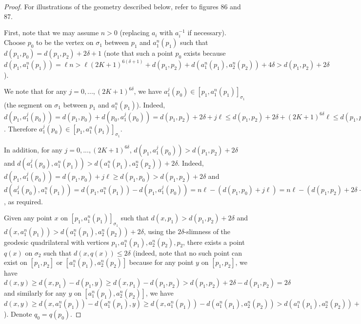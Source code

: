 \documentclass[12pt]{article}
\newcommand{\vs}{\vskip10pt}
\begin{document}
	\begin{proof}
		
		For illustrations of the geometry described below, refer to figures 86 and 87. 
		
		\vs
		
		First, note that we may assume $n > 0$ (replacing $a_i$ with $a_i^{-1}$ if necessary). Choose $p_0$ to be the vertex on $\sigma_1$ between $p_1$ and $a_1^n (p_1)$ such that $d(p_1, p_0) = d(p_1, p_2) + 2 \delta + 1$ (note that such a point $p_0$ exists because $d(p_1, a_1^n (p_1)) = \ell n > \ell (2K + 1)^{6 (\delta + 1)} + d(p_1, p_2) + d(a_1^n(p_1), a_2^n(p_2)) + 4 \delta > d(p_1, p_2) + 2 \delta$). 
		
		\vs 
		
		We note that for any $j = 0,..., (2K+1)^{6 \delta}$, we have $a_1^j (p_0) \in [p_1, a_1^n(p_1)]_{\sigma_1}$ (the segment on $\sigma_1$ between $p_1$ and $a_1^n(p_1)$). Indeed, $d(p_1, a_1^j (p_0)) = d(p_1, p_0) + d(p_0, a_1^j(p_0)) = d(p_1, p_2) + 2\delta + j \ell \leq d(p_1, p_2) + 2\delta + (2K + 1)^{6 \delta}\ell \leq d(p_1, p_2) + d(a_1^n(p_1), a_2^n(p_2)) + 4\delta + (2K + 1)^{6 \delta}\ell < \ell n = d(p_1, a_1^n (p_1))$. Therefore $a_1^j(p_0) \in [p_1, a_1^n(p_1)]_{\sigma_1}$. 
		
		\vs 
		
		In addition, for any $j = 0,..., (2K+1)^{6 \delta}$, $d(p_1, a_1^j(p_0)) > d(p_1, p_2) + 2 \delta$ and $d(a_1^j (p_0), a_1^n(p_1)) > d(a_1^n(p_1), a_2^n(p_2)) + 2 \delta$. Indeed, $d(p_1, a_1^j (p_0)) = d(p_1, p_0) + j \ell \geq d(p_1, p_0) > d(p_1, p_2) + 2 \delta$ and $d(a_1^j (p_0), a_1^n (p_1)) = d(p_1, a_1^n(p_1)) - d(p_1, a_1^j (p_0)) = n \ell - (d(p_1, p_0) + j \ell) = n \ell - (d(p_1, p_2) + 2 \delta + 1 + j \ell) \geq n\ell - (2K+1)^{6 \delta} \ell - d(p_1, p_2) - 2 \delta - 1 > (2K + 1)^{6 (\delta+1)} + d(p_1, p_2) + d(a_1^n(p_1), a_2^n (p_2)) + 4 \delta - (2K+1)^{6 \delta} \ell - d(p_1, p_2) - 2 \delta  - 1 > d(a_1^n (p_1), a_2^n (p_2)) + 2 \delta$, as required.
		
		\vs 
		
		Given any point $x$ on $[p_1, a_1^n (p_1)]_{\sigma_1}$ such that $d(x, p_1) > d(p_1, p_2) + 2 \delta$ and $d(x, a_1^n (p_1)) > d(a_1^n (p_1), a_2^n (p_2)) + 2 \delta$, using the $2\delta$-slimness of the geodesic quadrilateral with vertices $p_1, a_1^n (p_1), a_2^n (p_2), p_2$, there exists a point $q(x)$ on $\sigma_2$ such that $d(x, q(x)) \leq 2 \delta$ (indeed, note that no such point can exist on $[p_1, p_2]$ or $[a_1^n (p_1), a_2^n (p_2)]$ because for any point $y$ on $[p_1, p_2]$, we have $d(x,y) \geq d(x, p_1) - d(p_1, y) \geq d(x, p_1) - d(p_1, p_2) > d(p_1, p_2) + 2\delta - d(p_1, p_2) = 2\delta$ and similarly for any $y$ on $[a_1^n (p_1), a_2^n (p_2)]$, we have $d(x, y) \geq d(x, a_1^n (p_1)) - d(a_1^n (p_1), y) \geq d(x, a_1^n (p_1)) - d(a_1^n (p_1), a_2^n (p_2)) > d(a_1^n (p_1), a_2 ^n (p_2)) + 2\delta - d(a_1 ^n (p_1), a_2^n (p_2)) = 2 \delta$). Denote $q_0 = q(p_0)$. 
		

\end{proof}
\end{document}
